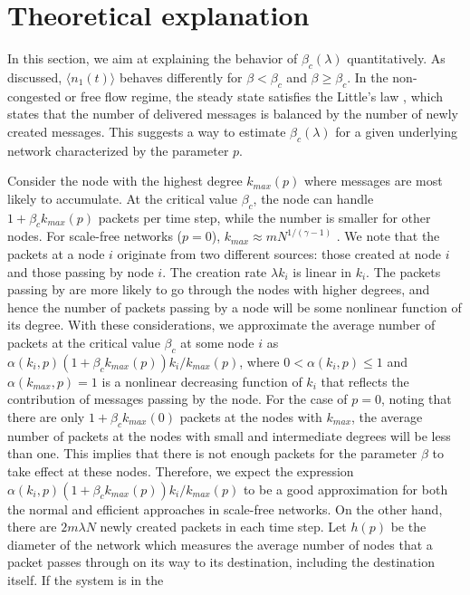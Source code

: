 \documentclass[aps,prl,twocolumn,superscriptaddress,showpacs]{revtex4}
\begin{document}
\section{Theoretical explanation}

In this section, we aim at explaining the behavior of
$\beta_{c}(\lambda)$ quantitatively.  As discussed, $\langle
n_{1}(t) \rangle$ behaves differently for $\beta < \beta_{c}$ and
$\beta \ge \beta_{c}$.  In the non-congested or free flow regime,
the steady state satisfies the Little's law \cite{Allen:1990},
which states that the number of delivered messages is balanced by
the number of newly created messages.  This suggests a way to
estimate $\beta_{c}(\lambda)$ for a given underlying network
characterized by the parameter $p$.

Consider the node with the highest degree $k_{max}(p)$ where
messages are most likely to accumulate. At the critical value
$\beta_{c}$, the node can handle $1+\beta_c k_{max}(p)$ packets
per time step, while the number is smaller for other nodes. For
scale-free networks ($p=0$), $k_{max}\approx m N^{1/(\gamma-1)}$
\cite{AB:2002}.  We note that the packets at a node $i$ originate
from two different sources: those created at node $i$ and those
passing by node $i$. The creation rate $\lambda k_i$ is linear in
$k_{i}$.  The packets passing by are more likely to go through the
nodes with higher degrees, and hence the number of packets passing
by a node will be some nonlinear function of its degree. With
these considerations, we approximate the average number of packets
at the critical value $\beta_{c}$ at some node $i$ as
$\alpha(k_i,p)(1+\beta_ck_{max}(p))k_i/k_{max}(p)$, where $0<
\alpha(k_i,p)\le 1$ and $\alpha(k_{max},p)=1$ is a nonlinear
decreasing function of $k_i$ that reflects the contribution of
messages passing by the node.  For the case of $p=0$, noting that
there are only $1+\beta_c k_{max}(0)$ packets at the nodes with
$k_{max}$, the average number of packets at the nodes with small
and intermediate degrees will be less than one.  This implies that
there is not enough packets for the parameter $\beta$ to take
effect at these nodes.  Therefore, we expect the expression
$\alpha(k_i,p)(1+\beta_ck_{max}(p))k_i/k_{max}(p)$ to be a good
approximation for both the normal and efficient approaches in
scale-free networks.  On the other hand, there are $2 m \lambda N$
newly created packets in each time step.  Let $h(p)$ be the
diameter of the network which measures the average number of nodes
that a packet passes through on its way to its destination,
including the destination itself.  If the system is in the
\end{document}
